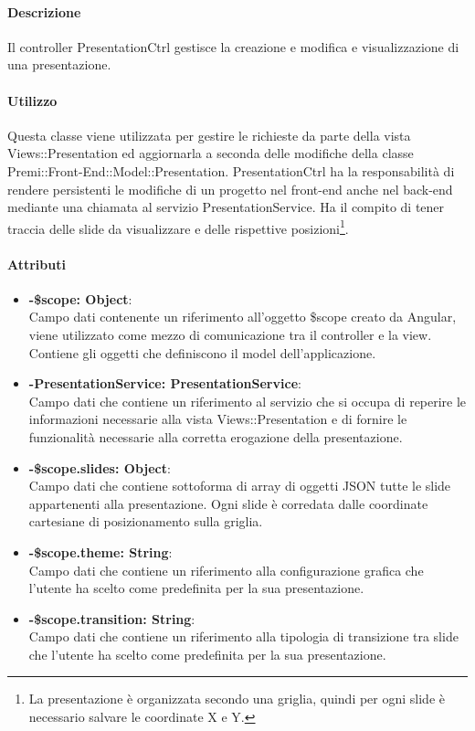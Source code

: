 	\paragraph{Descrizione}
	Il controller PresentationCtrl gestisce la creazione e modifica e visualizzazione di una presentazione.
	
	\paragraph{Utilizzo}
	Questa classe viene utilizzata per gestire le richieste da parte della vista Views::Presentation ed aggiornarla a seconda delle modifiche della classe Premi::Front-End::Model::Presentation. PresentationCtrl ha la responsabilità di rendere persistenti le modifiche di un progetto nel front-end anche nel back-end mediante una chiamata al servizio PresentationService.
	Ha il compito di tener traccia delle slide da visualizzare e delle rispettive posizioni\footnote{La presentazione è organizzata secondo una griglia, quindi per ogni slide è necessario salvare le coordinate X e Y.}.
	\paragraph{Attributi}
	\begin{itemize}
		\item \textbf{-\$scope: Object}:\\
			Campo dati contenente un riferimento all'oggetto \$scope creato da Angular, viene utilizzato come mezzo di comunicazione tra il controller e la view. Contiene gli oggetti che definiscono il model dell'applicazione.
		\item \textbf{-PresentationService: PresentationService}:\\
			Campo dati che contiene un riferimento al servizio che si occupa di reperire le informazioni necessarie alla vista Views::Presentation e di fornire le funzionalità necessarie alla corretta erogazione della presentazione.
		\item \textbf{-\$scope.slides: Object}:\\
			Campo dati che contiene sottoforma di array di oggetti JSON tutte le slide appartenenti alla presentazione. Ogni slide è corredata dalle coordinate cartesiane di posizionamento sulla griglia.
		
		\item \textbf{-\$scope.theme: String}:\\
			Campo dati che contiene un riferimento alla configurazione grafica che l'utente ha scelto come predefinita per la sua presentazione.
		
		\item \textbf{-\$scope.transition: String}:\\
			Campo dati che contiene un riferimento alla tipologia di transizione tra slide che l'utente ha scelto come predefinita per la sua presentazione.
	\end{itemize}
	

